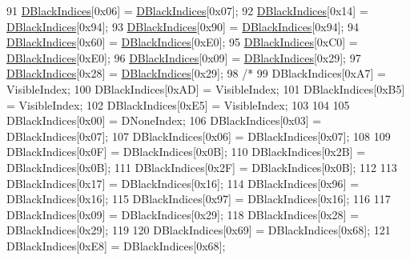 \begin{DoxyCode}
91     \hyperlink{classCFogRenderer_a09e3b546abbe52cc9addd1edfcc5ea9c}{DBlackIndices}[0x06] = \hyperlink{classCFogRenderer_a09e3b546abbe52cc9addd1edfcc5ea9c}{DBlackIndices}[0x07];
92     \hyperlink{classCFogRenderer_a09e3b546abbe52cc9addd1edfcc5ea9c}{DBlackIndices}[0x14] = \hyperlink{classCFogRenderer_a09e3b546abbe52cc9addd1edfcc5ea9c}{DBlackIndices}[0x94];
93     \hyperlink{classCFogRenderer_a09e3b546abbe52cc9addd1edfcc5ea9c}{DBlackIndices}[0x90] = \hyperlink{classCFogRenderer_a09e3b546abbe52cc9addd1edfcc5ea9c}{DBlackIndices}[0x94];
94     \hyperlink{classCFogRenderer_a09e3b546abbe52cc9addd1edfcc5ea9c}{DBlackIndices}[0x60] = \hyperlink{classCFogRenderer_a09e3b546abbe52cc9addd1edfcc5ea9c}{DBlackIndices}[0xE0];
95     \hyperlink{classCFogRenderer_a09e3b546abbe52cc9addd1edfcc5ea9c}{DBlackIndices}[0xC0] = \hyperlink{classCFogRenderer_a09e3b546abbe52cc9addd1edfcc5ea9c}{DBlackIndices}[0xE0];
96     \hyperlink{classCFogRenderer_a09e3b546abbe52cc9addd1edfcc5ea9c}{DBlackIndices}[0x09] = \hyperlink{classCFogRenderer_a09e3b546abbe52cc9addd1edfcc5ea9c}{DBlackIndices}[0x29];
97     \hyperlink{classCFogRenderer_a09e3b546abbe52cc9addd1edfcc5ea9c}{DBlackIndices}[0x28] = \hyperlink{classCFogRenderer_a09e3b546abbe52cc9addd1edfcc5ea9c}{DBlackIndices}[0x29];
98     \textcolor{comment}{/*}
99 \textcolor{comment}{    DBlackIndices[0xA7] = VisibleIndex;}
100 \textcolor{comment}{    DBlackIndices[0xAD] = VisibleIndex;}
101 \textcolor{comment}{    DBlackIndices[0xB5] = VisibleIndex;}
102 \textcolor{comment}{    DBlackIndices[0xE5] = VisibleIndex;}
103 \textcolor{comment}{    }
104 \textcolor{comment}{    }
105 \textcolor{comment}{    DBlackIndices[0x00] = DNoneIndex;}
106 \textcolor{comment}{    DBlackIndices[0x03] = DBlackIndices[0x07];}
107 \textcolor{comment}{    DBlackIndices[0x06] = DBlackIndices[0x07];}
108 \textcolor{comment}{    }
109 \textcolor{comment}{    DBlackIndices[0x0F] = DBlackIndices[0x0B];}
110 \textcolor{comment}{    DBlackIndices[0x2B] = DBlackIndices[0x0B];}
111 \textcolor{comment}{    DBlackIndices[0x2F] = DBlackIndices[0x0B];}
112 \textcolor{comment}{    }
113 \textcolor{comment}{    DBlackIndices[0x17] = DBlackIndices[0x16];}
114 \textcolor{comment}{    DBlackIndices[0x96] = DBlackIndices[0x16];}
115 \textcolor{comment}{    DBlackIndices[0x97] = DBlackIndices[0x16];}
116 \textcolor{comment}{    }
117 \textcolor{comment}{    DBlackIndices[0x09] = DBlackIndices[0x29];}
118 \textcolor{comment}{    DBlackIndices[0x28] = DBlackIndices[0x29];}
119 \textcolor{comment}{    }
120 \textcolor{comment}{    DBlackIndices[0x69] = DBlackIndices[0x68];}
121 \textcolor{comment}{    DBlackIndices[0xE8] = DBlackIndices[0x68];}

\end{DoxyCode}
